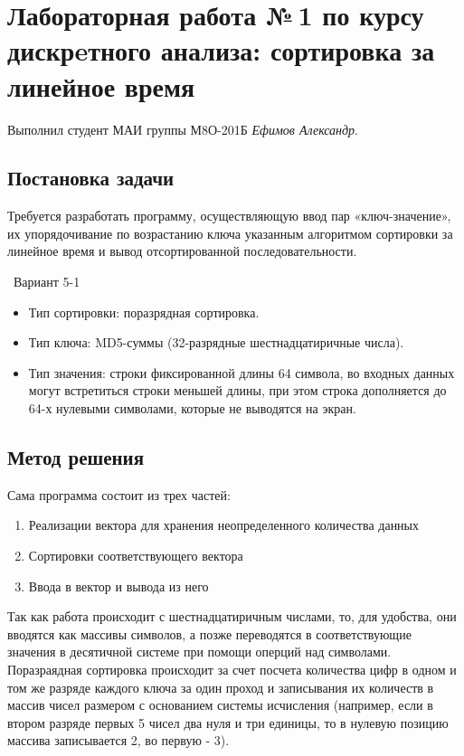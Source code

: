 \documentclass[12pt]{article}
\begin{document}
\section*{Лабораторная работа №\,1 по курсу дискрeтного анализа: сортировка за линейное время}

Выполнил студент МАИ группы М8О-201Б \textit{Ефимов Александр}.

\subsection*{Постановка задачи}


Требуется разработать программу, осуществляющую ввод пар «ключ-значение»,
  их упорядочивание по возрастанию ключа указанным алгоритмом сортировки за линейное время и вывод отсортированной последовательности.
  
 \ Вариант 5-1 
\begin{itemize}
\item Тип сортировки: поразрядная сортировка.
\item Тип ключа: MD5-суммы (32-разрядные шестнадцатиричные числа).
\item Тип значения: строки фиксированной длины 64 символа, во входных данных могут встретиться строки меньшей длины, при этом строка дополняется до 64-х нулевыми символами, которые не выводятся на экран.
\end{itemize}

\subsection*{Метод решения}


Сама программа состоит из трех частей:
\begin{enumerate}
\item Реализации вектора для хранения неопределенного количества данных
\item Сортировки соответствующего вектора
\item Ввода в вектор и вывода из него
\end{enumerate}
Так как работа происходит с шестнадцатиричным числами, то, для удобства, они вводятся как массивы символов, а позже переводятся в соответствующие значения в десятичной системе при помощи оперций над символами.\\
Поразраядная сортировка происходит за счет посчета количества цифр в одном и том же разряде каждого ключа за один проход и записывания их количеств в  массив чисел размером с основанием системы исчисления (например, если в втором разряде первых 5 чисел два нуля и три единицы, то в нулевую позицию массива записывается 2, во первую - 3).
\end{document}
